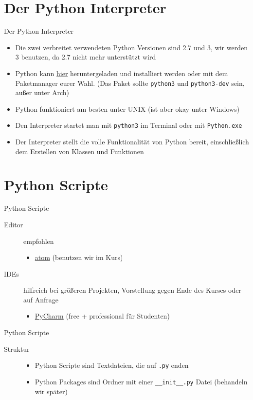 \section{Der Python Interpreter}
\begin{frame}{Der Python Interpreter}
	\begin{itemize}
    	\item Die zwei verbreitet verwendeten Python Versionen sind 2.7 und 3, wir werden 3 benutzen, da 2.7 nicht mehr unterstützt wird
		\item Python kann \alert{\href{http://www.python.org}{hier}} heruntergeladen und installiert werden oder mit dem Paketmanager eurer Wahl. (Das Paket sollte \texttt{python3} und \texttt{python3-dev} sein, außer unter Arch)
    	\item Python funktioniert am besten unter UNIX (ist aber okay unter Windows)
    	\item Den Interpreter startet man mit \texttt{python3} im Terminal oder mit \texttt{Python.exe}
    	\item Der Interpreter stellt die volle Funktionalität von Python bereit, einschließlich dem Erstellen von Klassen und Funktionen
	\end{itemize}
\end{frame}

\section{Python Scripte}
\begin{frame}{Python Scripte}
\begin{description}
   	\item[Editor] empfohlen
    \begin{itemize}
        \item \href{https://atom.io}{atom} (benutzen wir im Kurs)
    \end{itemize}
    \item[IDEs] hilfreich bei grö\ss{}eren Projekten, Vorstellung gegen Ende des Kurses oder auf Anfrage
    \begin{itemize}
       	\item \href{https://jetbrains.com/pycharm}{PyCharm} (free + professional für Studenten)
   	\end{itemize}
\end{description}
\end{frame}
\begin{frame}{Python Scripte}
\begin{description}
   	\item[Struktur]
   	\begin{itemize}
       	\item Python Scripte sind Textdateien, die auf \texttt{.py} enden
        \item Python Packages sind Ordner mit einer \texttt{\_\_init\_\_.py} Datei (behandeln wir später)
    \end{itemize}
\end{description}
\end{frame}


